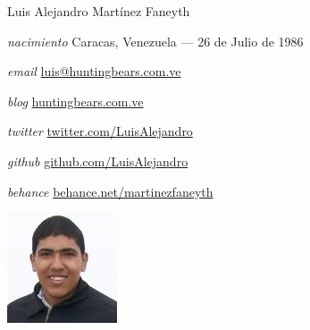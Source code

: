 \documentclass[11pt,letterpaper]{article}
\begin{document}
\begin{cv}{Luis Alejandro Mart\'inez Faneyth}
\vspace{1em}

\begin{minipage}{.7\linewidth}
\begin{cvlist}{}
\item[\textit{\large{nacimiento}}]{Caracas, Venezuela --- 26 de Julio de 1986}
\item[\textit{\large{email}}]{\href{mailto:luis@huntingbears.com.ve}{luis@huntingbears.com.ve}}
\item[\textit{\large{blog}}]{\href{http://huntingbears.com.ve/}{huntingbears.com.ve}}
\item[\textit{\large{twitter}}]{\href{http://twitter.com/LuisAlejandro}{twitter.com/LuisAlejandro}}
\item[\textit{\large{github}}]{\href{http://github.com/LuisAlejandro}{github.com/LuisAlejandro}}
\item[\textit{\large{behance}}]{\href{http://www.behance.net/martinezfaneyth}{behance.net/martinezfaneyth}}
\end{cvlist}
\end{minipage}
\begin{minipage}{.3\linewidth}
\includegraphics{curriculumvitae.jpg}
\end{minipage}
\vspace{1em}


\end{cv}
\end{document}
